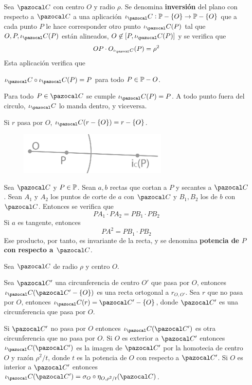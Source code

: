  Sea $\C$ con centro $O$ y radio $\rho$. Se denomina \textbf{inversión} del plano con respecto a $\C$ a una aplicación $\iota_\C: \P- \{O\}\rightarrow \P-\{O\}$ que a cada punto $P$ le hace corresponder otro punto $\iota_\C(P)$ tal que $O, P, \iota_\C(P)$ están alineados, $O\not\in [P, \iota_\C(P)]$ y se verifica que 
$$OP\cdot O_{\iota_\C}(P) = \rho^2$$
Esta aplicación verifica que 
\begin{itemizex}
	\item $\iota_\C\circ \iota_\C(P) = P$ para todo $P\in \P -{O}$.
	\item Para todo $P \in \C$ se cumple $\iota_\C(P) = P$. A todo punto fuera del circulo, $\iota_\C$ lo manda dentro, y viceversa.
	\item Si $r$ pasa por $O$, $\iota_\C(r-\{O\}) = r-\{O\}$.
\end{itemizex}
\begin{figure}[H]
	\centering
	\includegraphics[width=7.5cm]{figuras/8-15.png}
	\vspace{-1em}
\end{figure}
 Sea $\C$ y $P\in \P$. Sean $a, b$ rectas que cortan a $P$ y secantes a $\C$. Sean $A_1$ y $A_2$ los puntos de corte de $a$ con $\C$ y $B_1, B_2$ los de $b$ con $\C$. Entonces se verifica que 
\[PA_1\cdot PA_2 = PB_1 \cdot PB_2  \] 
Si $a$ es tangente, entonces 
\[PA^2 = PB_1 \cdot PB_2  \] 
Ese producto, por tanto, es invariante de la recta, y se denomina \textbf{potencia de $P$ con respecto a $\C$}.

 Sea $\C$ de radio $\rho$ y centro $O$.
\begin{itemizex}
	\item Sea $\C'$ una circunferencia de centro $O'$ que pasa por $O$, entonces $\iota_\C(\C'-\{O\})$ es una recta ortogonal a $r_{O,O'}$. Sea $r$ que no pasa por $O$, entonces $\iota_\C(r) = \C'-\{O\}$, donde $\C'$ es una circunferencia que pasa por $O$.
	\item Si $\C'$ no pasa por $O$ entonces $\iota_\C(\C')$ es otra circunferencia que no pasa por $O$. Si $O$ es exterior a $\C'$ entonces $\iota_\C(\C')$ es la imagen de $\C'$ por la homotecia de centro $O$ y razón $\rho^2/t$, donde $t$ es la potencia de $O$ con respecto a $\C'$. Si $O$ es interior a $\C'$ entonces $\iota_\C(\C') = \sigma_O \circ \eta_{O,\rho^2/t}(\C)$.
\end{itemizex}

